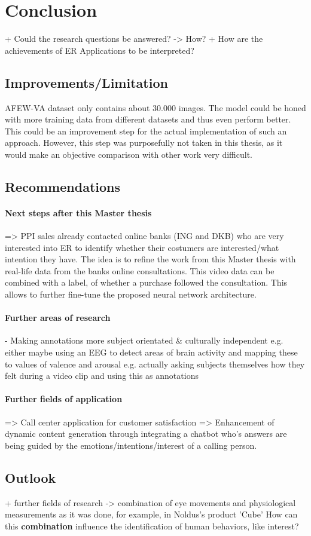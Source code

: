 
\chapter{Conclusion}
+ Could the research questions be answered? -> How?
+ How are the achievements of ER Applications to be interpreted?

\section{Improvements/Limitation}
AFEW-VA dataset only contains about 30.000 images. The model could be honed with more training data from different datasets and thus even perform better. This could be an improvement step for the actual implementation of such an approach. However, this step was purposefully not taken in this thesis, as it would make an objective comparison with other work very difficult.


\section{Recommendations}
\subsubsection{Next steps after this Master thesis}
=> PPI sales already contacted online banks (ING and DKB) who are very interested into ER to identify whether their costumers are interested/what intention they have.
The idea is to refine the work from this Master thesis with real-life data from the banks online consultations. This video data can be combined with a label, of whether a purchase followed the consultation. This allows to further fine-tune the proposed neural network architecture.

\subsubsection{Further areas of research}
- Making annotations more subject orientated \& culturally independent
e.g. either maybe using an EEG to detect areas of brain activity and mapping these to values of valence and arousal
e.g. actually asking subjects themselves how they felt during a video clip and using this as annotations

\subsubsection{Further fields of application}
=> Call center application for customer satisfaction
=> Enhancement of dynamic content generation through integrating a chatbot who's answers are being guided by the emotions/intentions/interest of a calling person.


\section{Outlook}
+ further fields of research
        -> combination of eye movements and physiological measurements as it was done, for example, in Noldus's product 'Cube' \citep{Noldus:2020:Facereader}
        How can this\textbf{ combination} influence the identification of human behaviors, like interest?